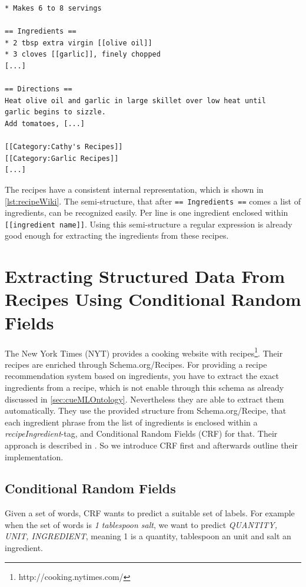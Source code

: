 \documentclass[12pt, twoside]{report}
\begin{document}
\begin{lstlisting}[frame=single, basicstyle=\footnotesize\ttfamily,caption={Shortened example recipe from \\ http://recipes.wikia.com/wiki/Recipes\_Wiki}, label=lst:recipeWiki]
* Makes 6 to 8 servings

== Ingredients ==
* 2 tbsp extra virgin [[olive oil]]
* 3 cloves [[garlic]], finely chopped
[...]

== Directions ==
Heat olive oil and garlic in large skillet over low heat until
garlic begins to sizzle.
Add tomatoes, [...]

[[Category:Cathy's Recipes]]
[[Category:Garlic Recipes]]
[...]
\end{lstlisting}

The recipes have a consistent internal representation, which is shown in \cref{lst:recipeWiki}. The semi-structure, that after \texttt{== Ingredients ==} comes a list of ingredients, can be recognized easily. Per line is one ingredient enclosed within \texttt{[[ingredient name]]}. Using this semi-structure a regular expression is already good enough for extracting the ingredients from these recipes.

\section{Extracting Structured Data From Recipes Using Conditional Random Fields}\label{sec:crfzeit}
The New York Times (NYT) provides a cooking website with recipes\footnote{http://cooking.nytimes.com/}. Their recipes are enriched through Schema.org/Recipes. For providing a recipe recommendation system based on ingredients, you have to extract the exact ingredients from a recipe, which is not enable through this schema as already discussed in \cref{sec:cueMLOntology}. Nevertheless they are able to extract them automatically. They use the provided structure from Schema.org/Recipe, that each ingredient phrase from the list of ingredients is enclosed within a \textit{recipeIngredient}-tag, and Conditional Random Fields (CRF) for that. Their approach is described in \parencite{CRFZeit}. So we introduce CRF first and afterwards outline their implementation.  

\subsection{Conditional Random Fields}
Given a set of words, CRF wants to predict a suitable set of labels. For example when the set of words is \textit{1 tablespoon salt}, we want to predict \textit{QUANTITY, UNIT, INGREDIENT}, meaning 1 is a quantity, tablespoon an unit and salt an ingredient.
\end{document}

